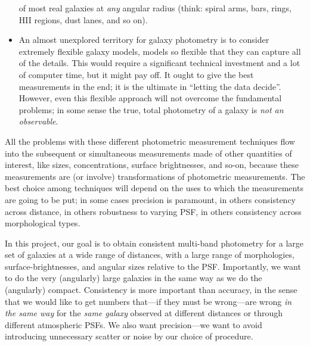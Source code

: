 \documentclass[12pt,preprint,pdftex]{aastex}
\begin{document}
\begin{itemize}
  of most real galaxies at \emph{any} angular radius (think: spiral
  arms, bars, rings, HII regions, dust lanes, and so on).
\item An almost unexplored territory for galaxy photometry is to
  consider extremely flexible galaxy models, models so flexible that
  they can capture all of the details.  This would require a
  significant technical investment and a lot of computer time, but it
  might pay off.  It ought to give the best measurements in the end;
  it is the ultimate in ``letting the data decide''.  However, even
  this flexible approach will not overcome the fundamental problems; in
  some sense the true, total photometry of a galaxy is \emph{not an
    observable}.
\end{itemize}
All the problems with these different photometric measurement
techniques flow into the subsequent or simultaneous measurements made
of other quantities of interest, like sizes, concentrations, surface
brightnesses, and so-on, because these measurements are (or involve)
transformations of photometric measurements.  The best choice among
techniques will depend on the uses to which the measurements are going
to be put; in some cases precision is paramount, in others consistency
across distance, in others robustness to varying PSF, in others
consistency across morphological types.

In this project, our goal is to obtain consistent multi-band
photometry for a large set of galaxies at a wide range of distances,
with a large range of morphologies, surface-brightnesses, and angular
sizes relative to the PSF.  Importantly, we want to do the very
(angularly) large galaxies in the same way as we do the (angularly)
compact.  Consistency is more important than accuracy, in the sense
that we would like to get numbers that---if they must be wrong---are
wrong \emph{in the same way} for the \emph{same galaxy} observed at
different distances or through different atmospheric PSFs.  We also
want precision---we want to avoid introducing unnecessary scatter or
noise by our choice of procedure.
\end{document}
